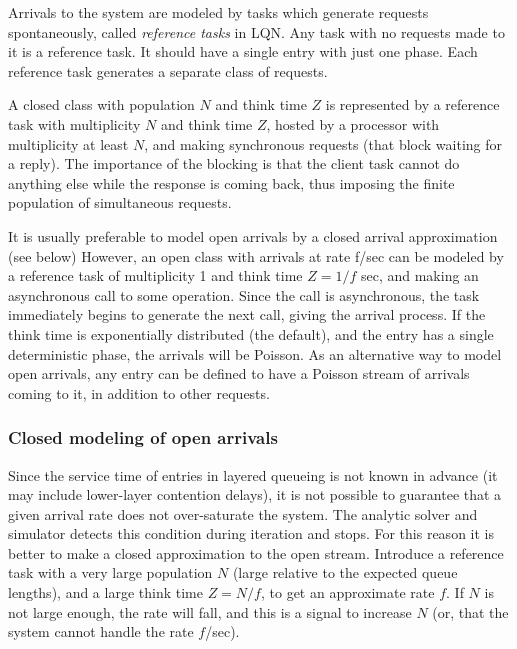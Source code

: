\documentclass[11pt]{article}
\begin{document}
Arrivals to the system are modeled by tasks which generate requests spontaneously, called
\emph{reference tasks} in LQN. Any task with no requests made to it is a reference task. It should have a 
single entry with just one phase. Each reference task generates a separate class of requests.

A closed class with population $N$ and think time $Z$ is represented by a reference task with
multiplicity $N$ and think time $Z$, hosted by a processor with multiplicity at least $N$, and making 
synchronous requests (that block waiting for a reply). The importance of the blocking is that the
client task cannot do anything else while the response is coming back, thus imposing the finite
population of simultaneous requests.

It is usually preferable to model open arrivals by a closed arrival approximation (see below)
However, an open class with arrivals at rate f/sec can be modeled by a reference task of multiplicity 
1 and think time $Z = 1/f$ sec, and making an asynchronous call to some operation. Since the call is
asynchronous, the task immediately begins to generate the next call, giving the arrival process. If
the think time is exponentially distributed (the default), and the entry has a single deterministic
phase, the arrivals will be Poisson. As an alternative way to model open arrivals, any entry can be
defined to have a Poisson stream of arrivals coming to it, in addition to other requests.

\subsubsection{Closed modeling of open arrivals}
Since the service time of entries in layered queueing is not 
known in advance (it may include lower-layer contention delays), it is not possible to guarantee that 
a given arrival rate does not over-saturate the system. The analytic solver and simulator detects this condition
during iteration and stops. For this reason it is better to make a closed approximation to the open stream. Introduce
a reference task with a very large population $N$ (large relative to the expected queue lengths), and 
a large think time $Z = N/f$, to get an approximate rate $f$. If $N$ is not large enough, the rate will fall, and 
this is a signal to increase $N$ (or, that the system cannot handle the rate $f$/sec).
\end{document}

